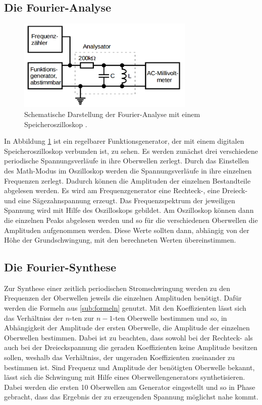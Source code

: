 \documentclass[
  bibliography=totoc,     %
  captions=tableheading,  %
  titlepage=firstiscover, %
]{scrartcl}
\begin{document}
\subsection{Die Fourier-Analyse}
\begin{figure}[htb]
  \centering
  \includegraphics[width=0.75\textwidth]{V3511.png}
  \caption{Schematische Darstellung der Fourier-Analyse mit einem Speicheroszilloskop \cite{anleitung}.}
  \label{fig:V3511}
\end{figure}
In Abbildung \ref{fig:V3511} ist ein regelbarer Funktionsgenerator, der mit einem
digitalen Speicheroszilloskop verbunden ist, zu sehen. Es werden zunächst drei
verschiedene periodische Spannungsverläufe in ihre Oberwellen zerlegt.
Durch das Einstellen des Math-Modus im Oszilloskop werden die Spannungsverläufe
in ihre einzelnen Frequenzen zerlegt. Dadurch können die Amplituden der
einzelnen Bestandteile abgelesen werden. Es wird am Frequenzgenerator eine
Rechteck-, eine Dreieck- und eine Sägezahnspannung erzeugt. Das Frequenzspektrum
der jeweiligen Spannung wird mit Hilfe des Oszilloskops gebildet. Am
Oszilloskop können dann die einzelnen Peaks abgelesen werden und so für die
verschiedenen Oberwellen die Amplituden aufgenommen werden. Diese Werte
sollten dann, abhängig von der Höhe der Grundschwingung, mit den berechneten
Werten übereinstimmen.
\subsection{Die Fourier-Synthese}
Zur Synthese einer zeitlich periodischen Stromschwingung werden zu den
Frequenzen der Oberwellen jeweils die einzelnen Amplituden benötigt. Dafür werden
die Formeln aus \ref{sub:formeln} genutzt. Mit den Koeffizienten lässt sich das
Verhältniss der $n$-ten zur $n-1$-ten Oberwelle bestimmen und so, in Abhängigkeit
der Amplitude der ersten Oberwelle, die Amplitude der einzelnen Oberwellen bestimmen.
Dabei ist zu beachten, dass sowohl bei der Rechteck- als auch bei der Dreieckspannung
die geraden Koeffizienten keine Amplitude besitzen sollen, weshalb das Verhältniss, der
ungeraden Koeffizienten zueinander zu bestimmen ist.
Sind Frequenz und Amplitude der benötigten Oberwelle bekannt, lässt sich die Schwingung
mit Hilfe eines Oberwellengenerators synthetisieren. Dabei werden die ersten 10 Oberwellen am
Generator eingestellt und so in Phase gebracht, dass das Ergebnis der zu
erzeugenden Spannung möglichst nahe kommt.
\newpage
\end{document}
